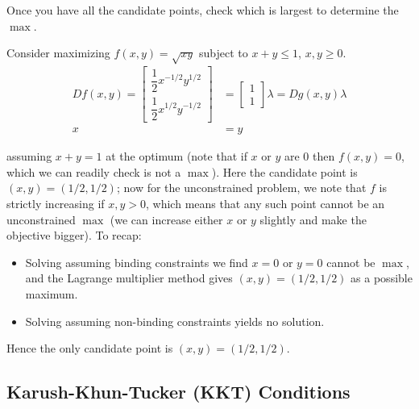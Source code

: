 \documentclass{article}
\begin{document}
Once you have all the candidate points, check which is largest to determine the $\max$.
\begin{example}
  Consider maximizing $f(x, y) = \sqrt{xy}$ subject to $x + y \le 1$, $x, y \ge 0$.
  \begin{align*}
    Df(x, y)
    =
    \begin{bmatrix}
      \dfrac{1}{2} x^{-1/2} y^{1/2}
      \\
      \dfrac{1}{2} x^{1/2} y^{-1/2}
    \end{bmatrix}
    &
    =
    \begin{bmatrix}
      1
      \\
      1
    \end{bmatrix}
    \lambda
    =
    Dg(x, y) \lambda
    \\
    x & = y
  \end{align*}

  assuming  $x + y = 1$ at the optimum (note that if $x$ or $y$ are $0$ then $f(x, y) = 0$, which we can readily check is not a $\max$).  Here the candidate point is $(x, y) = (1/2, 1/2)$; now for the unconstrained problem, we note that $f$ is strictly increasing if $x, y > 0$, which means that any such point cannot be an unconstrained $\max$ (we can increase either $x$ or $y$ slightly and make the objective bigger). To recap:
  \begin{itemize}[label=$\bullet$]
    \item Solving assuming binding constraints we find $x = 0$ or $y = 0$ cannot be $\max$, and the Lagrange multiplier method  gives $(x, y) = (1/2, 1/2)$ as a possible maximum.

    \item Solving assuming non-binding constraints yields no solution.
  \end{itemize}

  Hence the only candidate point is $(x, y) = (1/2, 1/2)$.
\end{example}

\subsection{Karush-Khun-Tucker (KKT) Conditions}
\label{sub:karush_khun_tucker_kkt_conditions}
\end{document}

